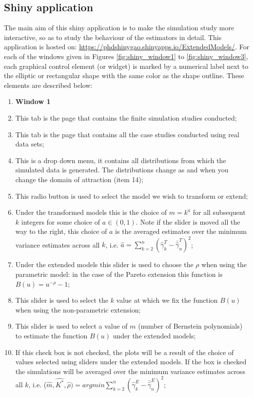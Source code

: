 \begin{subappendices}
\section{Shiny application}\label{shiny}
The main aim of this shiny application is to make the simulation study more interactive, so as to study the behaviour of the estimators in detail. This application is hosted on: \url{https://phdshinygao.shinyapps.io/ExtendedModels/}. For each of the windows given in Figures \ref{fig:shiny_window1} to \ref{fig:shiny_window3}, each graphical control element (or widget) is marked by a numerical label next to the elliptic or rectangular shape with the same color as the shape outline. These elements are described below:

\begin{enumerate}
   \item[] {\large \textbf{Window 1}}
    \item This tab is the page that contains the finite simulation studies conducted;
    \item This tab is the page that contains all the case studies conducted using real data sets;
    \item This is a drop down menu, it contains all distributions from which the simulated data is generated. The distributions change as and when you change the domain of attraction (item 14);
    \item This radio button is used to select the model we wish to transform or extend;
    \item Under the transformed models this is the choice of $m = k^a$ for all subsequent $k$ integers for some choice of $a\in (0,1)$. Note if the slider is moved all the way to the right, this choice of $a$ is the averaged estimates over the minimum variance estimates across all $k$, i.e. $\hat{a} = \sum_{k=2}^n (\hat{\gamma}_k^T - \bar{\hat{\gamma}}^T_n)^2$;
    \item Under the extended models this slider is used to choose the $\rho$ when using the parametric model: in the case of the Pareto extension this function is $B(u) = u^{-\rho}-1$;
    \item This slider is used to select the $k$ value at which we fix the function $B(u)$ when using the non-parametric extension;
    \item This slider is used to select a value of $m$ (number of Bernstein polynomials) to estimate the function $B(u)$ under the extended models;
    \item If this check box is not checked, the plots will be a result of the choice of values selected using sliders under the extended models. If the box is checked the simulations will be averaged over the minimum variance estimates across all $k$, i.e. ($\hat{m},\hat{K^*}, \hat{\rho}) = argmin \sum_{k=2}^n (\hat{\gamma}_k^E - \bar{\hat{\gamma}}^E_n)^2$;

\end{enumerate}
\end{subappendices}
